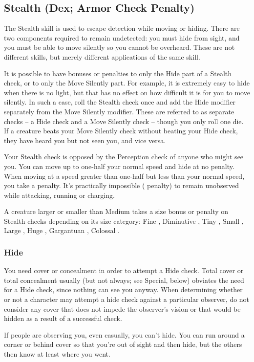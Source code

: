 \subsection{Stealth (Dex; Armor Check Penalty)}
The Stealth skill is used to escape detection while moving or hiding. There are two components required to remain undetected: you must hide from sight, and you must be able to move silently so you cannot be overheard. These are not different skills, but merely different applications of the same skill.

It is possible to have bonuses or penalties to only the Hide part of a Stealth check, or to only the Move Silently part. For example, it is extremely easy to hide when there is no light, but that has no effect on how difficult it is for you to move silently. In such a case, roll the Stealth check once and add the Hide modifier separately from the Move Silently modifier. These are referred to as separate checks -- a Hide check and a Move Silently check -- though you only roll one die. If a creature beats your Move Silently check without beating your Hide check, they have heard you but not seen you, and vice versa.

 Your Stealth check is opposed by the Perception check of anyone who might see you. You can move up to one-half your normal speed and hide at no penalty. When moving at a speed greater than one-half but less than your normal speed, you take a  penalty. It's practically impossible ( penalty) to remain unobserved while attacking, running or charging.

A creature larger or smaller than Medium takes a size bonus or penalty on Stealth checks depending on its size category: Fine , Diminutive , Tiny , Small , Large , Huge , Gargantuan , Colossal .

\subsubsection{Hide}
You need cover or concealment in order to attempt a Hide check. Total cover or total concealment usually (but not always; see Special, below) obviates the need for a Hide check, since nothing can see you anyway. When determining whether or not a character may attempt a hide check against a particular observer, do not consider any cover that does not impede the observer's vision or that would be hidden as a result of a successful check.

If people are observing you, even casually, you can't hide. You can run around a corner or behind cover so that you're out of sight and then hide, but the others then know at least where you went.

